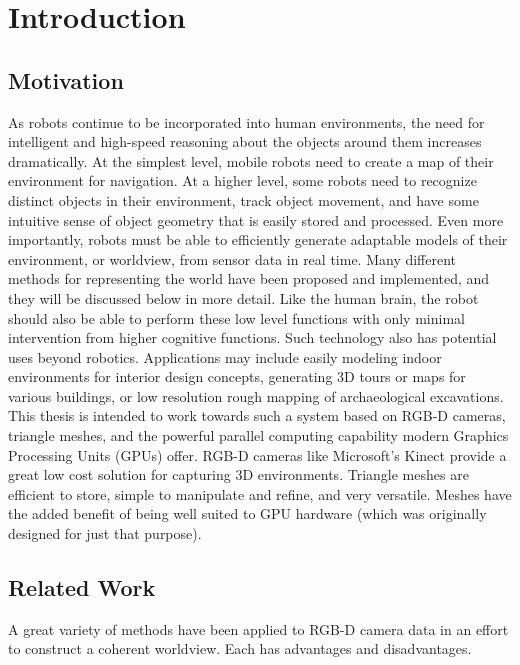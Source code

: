 \chapter{Introduction} %
\section{Motivation}
As robots continue to be incorporated into human environments, the need for intelligent and high-speed reasoning about the objects around them increases dramatically. At the simplest level, mobile robots need to create a map of their environment for navigation. At a higher level, some robots need to recognize distinct objects in their environment, track object movement, and have some intuitive sense of object geometry that is easily stored and processed. Even more importantly, robots must be able to efficiently generate adaptable models of their environment, or worldview, from sensor data in real time. Many different methods for representing the world have been proposed and implemented, and they will be discussed below in more detail. Like the human brain, the robot should also be able to perform these low level functions with only minimal intervention from higher cognitive functions. Such technology also has potential uses beyond robotics. Applications may include easily modeling indoor environments for interior design concepts, generating 3D tours or maps for various buildings, or low resolution rough mapping of archaeological excavations.\\

This thesis is intended to work towards such a system based on RGB-D cameras, triangle meshes, and the powerful parallel computing capability modern Graphics Processing Units (GPUs) offer. RGB-D cameras like Microsoft's Kinect provide a great low cost solution for capturing 3D environments. Triangle meshes are efficient to store, simple to manipulate and refine, and very versatile. Meshes have the added benefit of being well suited to GPU hardware (which was originally designed for just that purpose).
\section{Related Work} %
A great variety of methods have been applied to RGB-D camera data in an effort to construct a coherent worldview. Each has advantages and disadvantages.
